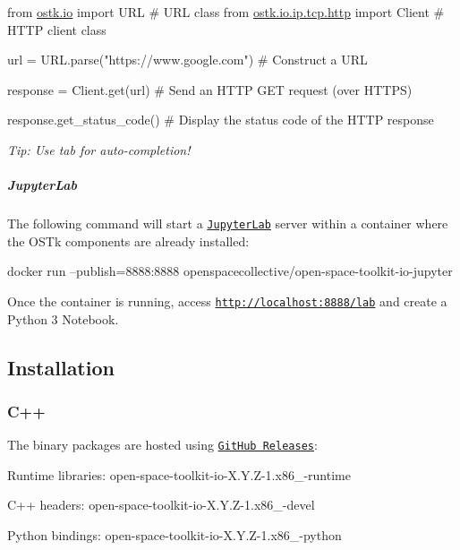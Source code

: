 \begin{DoxyCode}
\textcolor{keyword}{from} \hyperlink{namespaceostk_1_1io}{ostk.io} \textcolor{keyword}{import} URL \textcolor{comment}{# URL class}
\textcolor{keyword}{from} \hyperlink{namespaceostk_1_1io_1_1ip_1_1tcp_1_1http}{ostk.io.ip.tcp.http} \textcolor{keyword}{import} Client \textcolor{comment}{# HTTP client class}

url = URL.parse(\textcolor{stringliteral}{"https://www.google.com"}) \textcolor{comment}{# Construct a URL}

response = Client.get(url) \textcolor{comment}{# Send an HTTP GET request (over HTTPS)}

response.get\_status\_code() \textcolor{comment}{# Display the status code of the HTTP response}
\end{DoxyCode}


{\itshape Tip\+: Use tab for auto-\/completion!}

\subparagraph*{Jupyter\+Lab}

The following command will start a \href{https://jupyterlab.readthedocs.io/en/stable/}{\tt Jupyter\+Lab} server within a container where the O\+S\+Tk components are already installed\+:


\begin{DoxyCode}
docker run --publish=8888:8888 openspacecollective/open-space-toolkit-io-jupyter
\end{DoxyCode}


Once the container is running, access \href{http://localhost:8888/lab}{\tt http\+://localhost\+:8888/lab} and create a Python 3 Notebook.

\subsection*{Installation}

\subsubsection*{C++}

The binary packages are hosted using \href{https://github.com/open-space-collective/open-space-toolkit-io/releases}{\tt Git\+Hub Releases}\+:


\begin{DoxyItemize}
\item Runtime libraries\+: {\ttfamily open-\/space-\/toolkit-\/io-\/\+X.\+Y.\+Z-\/1.\+x86\+\_-\/runtime}
\item C++ headers\+: {\ttfamily open-\/space-\/toolkit-\/io-\/\+X.\+Y.\+Z-\/1.\+x86\+\_-\/devel}
\item Python bindings\+: {\ttfamily open-\/space-\/toolkit-\/io-\/\+X.\+Y.\+Z-\/1.\+x86\+\_-\/python}
\end{DoxyItemize}

